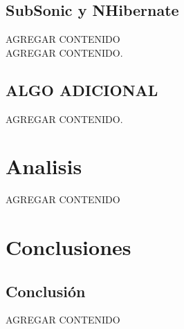 \documentclass[preprint,12pt]{elsarticle}
\begin{document}
\subsection{SubSonic y NHibernate}
AGREGAR CONTENIDO\cite{referenciaQuispe2}
\\
AGREGAR CONTENIDO.\cite{referenciarobles2}



\subsection{ALGO ADICIONAL}

AGREGAR CONTENIDO.\cite{referenciaporlles1}




\section{Analisis}

AGREGAR CONTENIDO



\section{Conclusiones}
\subsection{Conclusión }	
AGREGAR CONTENIDO


	
	

	
	\newpage
	
		 

    

	
\end{document}
